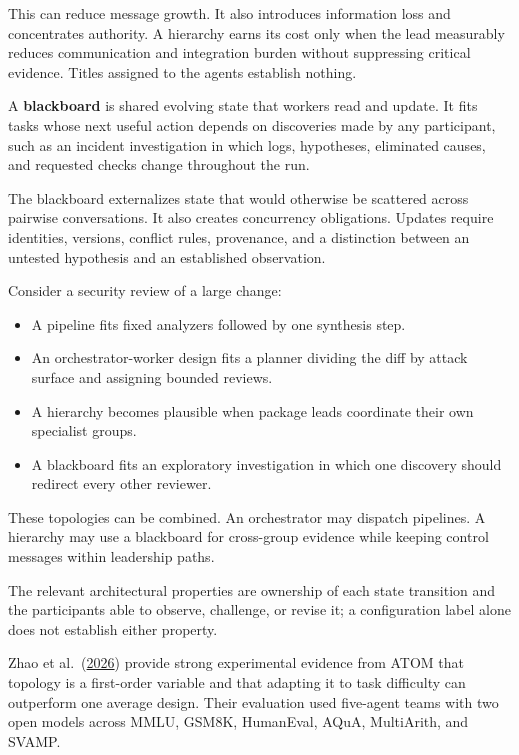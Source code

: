 This can reduce message growth. It also introduces information loss and concentrates authority. A hierarchy earns its cost only when the lead measurably reduces communication and integration burden without suppressing critical evidence. Titles assigned to the agents establish nothing.

A \textbf{blackboard} is shared evolving state that workers read and update. It fits tasks whose next useful action depends on discoveries made by any participant, such as an incident investigation in which logs, hypotheses, eliminated causes, and requested checks change throughout the run.

The blackboard externalizes state that would otherwise be scattered across pairwise conversations. It also creates concurrency obligations. Updates require identities, versions, conflict rules, provenance, and a distinction between an untested hypothesis and an established observation.


Consider a security review of a large change:

\begin{itemize}
\tightlist
\item
  A pipeline fits fixed analyzers followed by one synthesis step.
\item
  An orchestrator-worker design fits a planner dividing the diff by attack surface and assigning bounded reviews.
\item
  A hierarchy becomes plausible when package leads coordinate their own specialist groups.
\item
  A blackboard fits an exploratory investigation in which one discovery should redirect every other reviewer.
\end{itemize}

These topologies can be combined. An orchestrator may dispatch pipelines. A hierarchy may use a blackboard for cross-group evidence while keeping control messages within leadership paths.

The relevant architectural properties are ownership of each state transition and the participants able to observe, challenge, or revise it; a configuration label alone does not establish either property.

Zhao et al.~(\href{https://arxiv.org/abs/2605.26178}{2026}) provide strong experimental evidence from ATOM that topology is a first-order variable and that adapting it to task difficulty can outperform one average design. Their evaluation used five-agent teams with two open models across MMLU, GSM8K, HumanEval, AQuA, MultiArith, and SVAMP.

